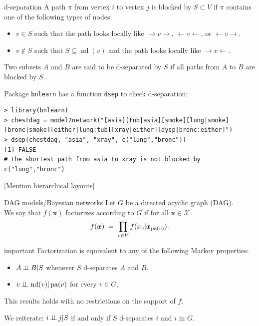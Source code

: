 \documentclass[dvipsnames,aspectratio=169]{beamer} %
\DeclareMathOperator{\pa}{pa}
\DeclareMathOperator{\nd}{nd}
\newcommand{\cX}{\mathcal{X}}
\newcommand{\bs}{\boldsymbol}
\newcommand{\indep}{\mbox{\,$\perp\!\!\!\perp$\,}}
\begin{document}
\begin{frame}[fragile]{d-separation}
	A path $\pi$ from vertex $i$ to vertex $j$ is \alert{blocked} by $S\subset V$ if $\pi$ contains one of the following types of nodes:
	\begin{itemize}
		\item $v\in S$ such that the path looks locally like $\to v\to $, $\leftarrow v\leftarrow$, or $\leftarrow v\to$.
		\item  $v\notin S$ such that $S\subseteq \nd(v)$ and the path looks locally like $\to v\leftarrow$.
	\end{itemize} 
	\bigskip
	
	Two subsets $A$ and $B$ are said to be \alert{d-separated} by $S$ if all paths from $A$ to $B$ are blocked by $S$.
	
	\medskip 
	Package \texttt{bnlearn} has a function \texttt{dsep} to check d-separation:
\begin{lstlisting}
> library(bnlearn)
> chestdag = model2network("[asia][tub|asia][smoke][lung|smoke][bronc|smoke][either|lung:tub][xray|either][dysp|bronc:either]")
> dsep(chestdag, "asia", "xray", c("lung","bronc"))	
[1] FALSE
# the shortest path from asia to xray is not blocked by c("lung","bronc")
\end{lstlisting}
[Mention hierarchical layouts]
\end{frame}

\begin{frame}{DAG models/Bayesian networks}
	Let $G$ be a directed acyclic graph (DAG).\\
	We say that $f(\bs x)$ factorizes according to $G$ if for all $\bs x\in \cX$
	$$
	f(\bs x)\;=\;\prod_{v\in V}f(x_v|\bs x_{{\rm pa}(v)}).
	$$
\begin{beamercolorbox}[wd=\paperwidth,sep=5pt]{important}
	Factorization is equivalent to any of the following Markov properties:
	\begin{itemize}
		\item [(G)] $A\indep B|S$ whenever $S$ d-separates $A$ and $B$.
		\item [(L)] $v\indep \nd(v)|\pa(v)$ for every $v\in G$.
	\end{itemize}
	This results holds with no restrictions on the support of $f$.
\end{beamercolorbox}	
\medskip
We reiterate: $i\indep j|S$ if and only if $S$ \alert{d-separates} $i$ and $i$ in $G$.
\end{frame}
\end{document}

